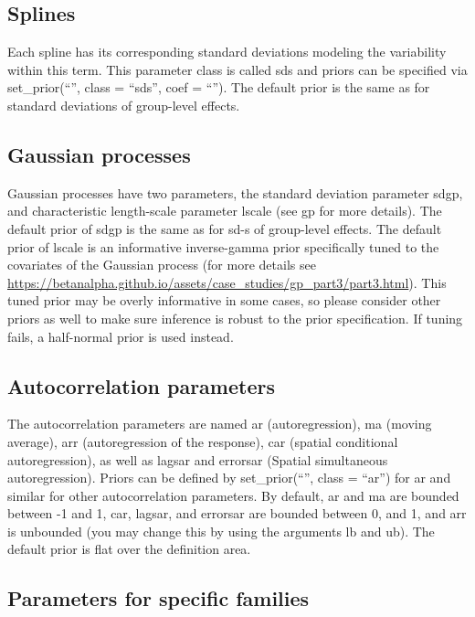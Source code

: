 \documentclass[]{book}
\begin{document}
\subsection{Splines}\label{splines}

Each spline has its corresponding standard deviations modeling the
variability within this term. This parameter class is called sds and
priors can be specified via set\_prior(``'', class = ``sds'', coef =
``''). The default prior is the same as for standard deviations of
group-level effects.

\subsection{Gaussian processes}\label{gaussian-processes}

Gaussian processes have two parameters, the standard deviation parameter
sdgp, and characteristic length-scale parameter lscale (see gp for more
details). The default prior of sdgp is the same as for sd-s of
group-level effects. The default prior of lscale is an informative
inverse-gamma prior specifically tuned to the covariates of the Gaussian
process (for more details see
\url{https://betanalpha.github.io/assets/case_studies/gp_part3/part3.html}).
This tuned prior may be overly informative in some cases, so please
consider other priors as well to make sure inference is robust to the
prior specification. If tuning fails, a half-normal prior is used
instead.

\subsection{Autocorrelation
parameters}\label{autocorrelation-parameters}

The autocorrelation parameters are named ar (autoregression), ma (moving
average), arr (autoregression of the response), car (spatial conditional
autoregression), as well as lagsar and errorsar (Spatial simultaneous
autoregression). Priors can be defined by set\_prior(``'', class =
``ar'') for ar and similar for other autocorrelation parameters. By
default, ar and ma are bounded between -1 and 1, car, lagsar, and
errorsar are bounded between 0, and 1, and arr is unbounded (you may
change this by using the arguments lb and ub). The default prior is flat
over the definition area.

\subsection{Parameters for specific
families}\label{parameters-for-specific-families}
\end{document}
